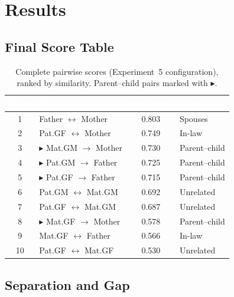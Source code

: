 \documentclass{../yalumba}
\begin{document}
\section{Results}
\label{sec:results}

\subsection{Final Score Table}

\begin{table}[H]
  \centering
  \tablestyle
  \caption{Complete pairwise scores (Experiment~5 configuration), ranked by
    similarity.  Parent--child pairs marked with $\blacktriangleright$.}
  \label{tab:scores}
  \begin{tabular}{clcl}
    \toprule
    \rowcolor{table-header}
    \textcolor{white}{\textbf{Rank}} &
    \textcolor{white}{\textbf{Pair}} &
    \textcolor{white}{\textbf{Similarity}} &
    \textcolor{white}{\textbf{Type}} \\
    \midrule
    1 & Father $\leftrightarrow$ Mother
      & 0.803 & Spouses \\
    2 & Pat.GF $\leftrightarrow$ Mother
      & 0.749 & In-law \\
    3 & $\blacktriangleright$ Mat.GM $\to$ Mother
      & 0.730 & Parent--child \\
    4 & $\blacktriangleright$ Pat.GM $\to$ Father
      & 0.725 & Parent--child \\
    5 & $\blacktriangleright$ Pat.GF $\to$ Father
      & 0.715 & Parent--child \\
    6 & Pat.GM $\leftrightarrow$ Mat.GM
      & 0.692 & Unrelated \\
    7 & Pat.GF $\leftrightarrow$ Mat.GM
      & 0.687 & Unrelated \\
    8 & $\blacktriangleright$ Mat.GF $\to$ Mother
      & 0.578 & Parent--child \\
    9 & Mat.GF $\leftrightarrow$ Father
      & 0.566 & In-law \\
    10 & Pat.GF $\leftrightarrow$ Mat.GF
      & 0.530 & Unrelated \\
    \bottomrule
  \end{tabular}
\end{table}

\subsection{Separation and Gap}
\end{document}
